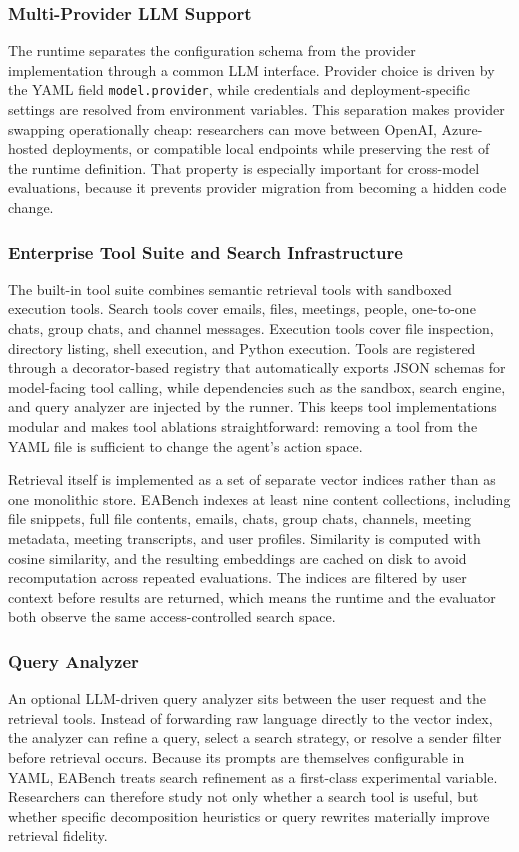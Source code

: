 \subsubsection{Multi-Provider LLM Support}

The runtime separates the configuration schema from the provider implementation through a common LLM interface. Provider choice is driven by the YAML field \texttt{model.provider}, while credentials and deployment-specific settings are resolved from environment variables. This separation makes provider swapping operationally cheap: researchers can move between OpenAI, Azure-hosted deployments, or compatible local endpoints while preserving the rest of the runtime definition. That property is especially important for cross-model evaluations, because it prevents provider migration from becoming a hidden code change.

\subsubsection{Enterprise Tool Suite and Search Infrastructure}

The built-in tool suite combines semantic retrieval tools with sandboxed execution tools. Search tools cover emails, files, meetings, people, one-to-one chats, group chats, and channel messages. Execution tools cover file inspection, directory listing, shell execution, and Python execution. Tools are registered through a decorator-based registry that automatically exports JSON schemas for model-facing tool calling, while dependencies such as the sandbox, search engine, and query analyzer are injected by the runner. This keeps tool implementations modular and makes tool ablations straightforward: removing a tool from the YAML file is sufficient to change the agent's action space.

Retrieval itself is implemented as a set of separate vector indices rather than as one monolithic store. EABench indexes at least nine content collections, including file snippets, full file contents, emails, chats, group chats, channels, meeting metadata, meeting transcripts, and user profiles. Similarity is computed with cosine similarity, and the resulting embeddings are cached on disk to avoid recomputation across repeated evaluations. The indices are filtered by user context before results are returned, which means the runtime and the evaluator both observe the same access-controlled search space.

\subsubsection{Query Analyzer}

An optional LLM-driven query analyzer sits between the user request and the retrieval tools. Instead of forwarding raw language directly to the vector index, the analyzer can refine a query, select a search strategy, or resolve a sender filter before retrieval occurs. Because its prompts are themselves configurable in YAML, EABench treats search refinement as a first-class experimental variable. Researchers can therefore study not only whether a search tool is useful, but whether specific decomposition heuristics or query rewrites materially improve retrieval fidelity.